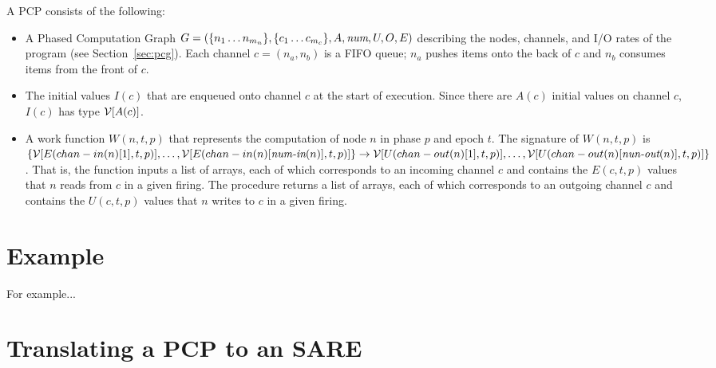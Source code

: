 A PCP consists of the following:
\begin{itemize}

\item A Phased Computation Graph $G = (\{n_1 \dots n_{m_n}\}, \{c_1
\dots c_{m_c}\}, A, \mbox{\it num}, U, O, E)$ describing the nodes,
channels, and I/O rates of the program (see Section~\ref{sec:pcg}).
Each channel $c = (n_a, n_b)$ is a FIFO queue; $n_a$ pushes items onto
the back of $c$ and $n_b$ consumes items from the front of $c$.

\item The initial values $I(c)$ that are enqueued onto channel $c$ at
the start of execution.  Since there are $A(c)$ initial values on
channel $c$, $I(c)$ has type ${\cal V}[A(c)]$.


\item A work function $W(n, t, p)$ that represents the computation of
node $n$ in phase $p$ and epoch $t$.  The signature of $W(n, t, p)$ is
$\{{\cal V}[E(chan-in(n)[1], t, p)], \dots, {\cal
V}[E(chan-in(n)[\mbox{\it num-in}(n)], t, p)]\} \rightarrow {\cal
V}[U(chan-out(n)[1], t, p)], \dots, {\cal
V}[U(chan-out(n)[\mbox{\it nun-out}(n)], t, p)]\}$.  That is, the function
inputs a list of arrays, each of which corresponds to an incoming
channel $c$ and contains the $E(c,t,p)$ values that $n$ reads from $c$
in a given firing.  The procedure returns a list of arrays, each of
which corresponds to an outgoing channel $c$ and contains the
$U(c,t,p)$ values that $n$ writes to $c$ in a given firing.

\end{itemize}


\section{Example}

For example...

\section{Translating a PCP to an SARE}

